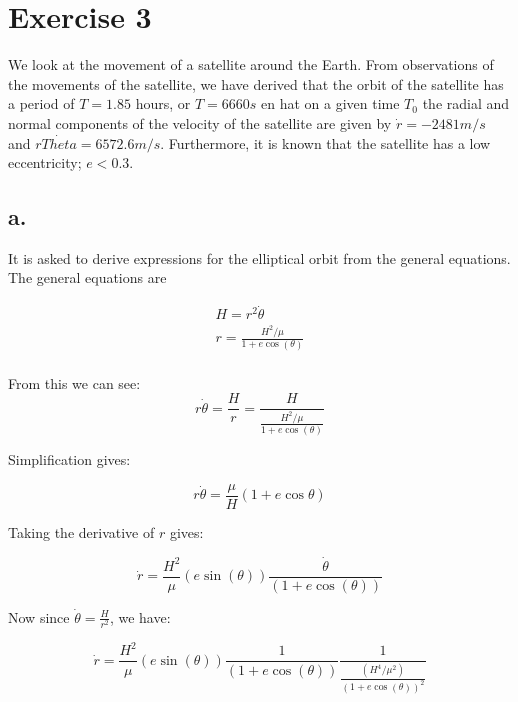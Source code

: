 \section{Exercise 3}
We look at the movement of a satellite around the Earth. From observations of the movements of the satellite, we have derived that the orbit of the satellite has a period of $T = 1.85$ hours, or $T = 6660 s$ en hat on a given time $T_0$ the radial and normal components of the velocity of the satellite are given by $\dot{r} = -2481 m/s$ and $r \dot{Theta} = 6572.6 m/s$. Furthermore, it is known that the satellite has a low eccentricity; $e<0.3$.

\subsection*{a.}
It is asked to derive expressions for the elliptical orbit from the general equations.
The general equations are

\begin{equation}
    \begin{split}
        H = r^2 \dot{\theta} \\
        r = \frac{H^2/\mu}{1+e \cos{(\theta)}} \\
    \end{split}
\end{equation}

From this we can see:
\begin{equation}
    r \dot{\theta} = \frac{H}{r} = \frac{H}{\frac{H^2/\mu}{1+e \cos{(\theta)}}}
\end{equation}

Simplification gives:

\begin{equation}
    r \dot{\theta} = \frac{\mu}{H}(1+e\cos{\theta})
\end{equation}

Taking the derivative of $r$ gives:

\begin{equation}
    \dot{r} = \frac{H^2}{\mu}(e\sin{(\theta)})\frac{\dot{\theta}}{(1+e\cos{(\theta)})}
\end{equation}

Now since $\dot{\theta} = \frac{H}{r^2}$, we have:

\begin{equation}
    \dot{r} = \frac{H^2}{\mu}(e\sin{(\theta)})\frac{1}{(1+e\cos{(\theta)})} \frac{1}{\frac{(H^4/\mu^2)}{(1+e\cos{(\theta)})^2}}
\end{equation}

